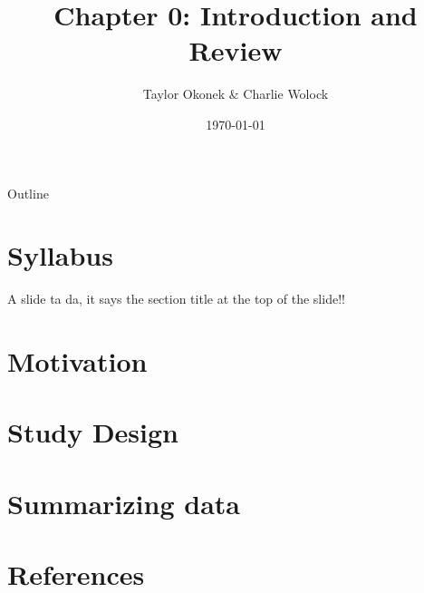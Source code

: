 \documentclass{beamer}
\title{Chapter 0: Introduction and Review}
\author{Taylor Okonek \& Charlie Wolock}
\date{\today}
\begin{document}
	\begin{frame}
	\titlepage 
\end{frame}
\begin{frame}{Outline}
\tableofcontents
\end{frame}


\section{Syllabus}

\begin{frame}{A slide}
ta da, it says the section title at the top of the slide!!
\end{frame}

\section{Motivation}

\section{Study Design}

\section{Summarizing data}

\section*{References}
\begin{frame}
\end{frame}
\end{document}
